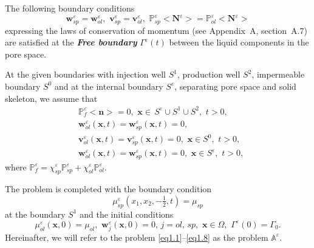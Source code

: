 \documentclass{article}
\theoremstyle{plain}
\theoremstyle{definition}
\numberwithin{equation}{section}
\begin{document}
The following boundary conditions 
\begin{equation}\label{eq1.5}
\boldsymbol{w}^{\varepsilon}_{sp}=\boldsymbol{w}^{\varepsilon}_{ol},\,\,
\boldsymbol{v}^{\varepsilon}_{sp}=\boldsymbol{v}^{\varepsilon}_{ol},\,\,
\mathbb{P}^{\varepsilon}_{sp}<\textbf{N}^{\varepsilon}>=
\mathbb{P}^{\varepsilon}_{ol}<\textbf{N}^{\varepsilon}>
\end{equation}
expressing the laws of conservation of momentum \cite{14} (see Appendix~A, section~A.7) are satisfied
at the \textbf{\emph{Free boundary}} $\Gamma^{\varepsilon}(t)$ between the liquid components in the pore space.

At the given boundaries with injection well ${S}^{1}$, production well ${S}^{2}$, impermeable boundary ${S}^{0}$ and at the internal boundary $S^{\varepsilon}$, separating pore space and solid skeleton, we assume that
\begin{equation}\label{eq1.6}
\begin{aligned}
&
\mathbb{P}^{\varepsilon}_{f}<\boldsymbol{n}>=0,\,\,
\boldsymbol{x}\in\,{S}^{\varepsilon}\cup{S}^{1}\cup{S}^{2},\,\,t>0,
\\
& \boldsymbol{w}^{\varepsilon}_{ol}(\boldsymbol{x},t)=
\boldsymbol{w}^{\varepsilon}_{sp}(\boldsymbol{x},t)=0,
\\
& \boldsymbol{v}^{\varepsilon}_{ol}(\boldsymbol{x},t)=
\boldsymbol{v}^{\varepsilon}_{sp}(\boldsymbol{x},t)=0,\,\,\boldsymbol{x}\in{S}^{0},\,\,t>0,
\\
& \boldsymbol{w}^{\varepsilon}_{ol}(\boldsymbol{x},t)=
\boldsymbol{w}^{\varepsilon}_{sp}(\boldsymbol{x},t)=0,\,\,\boldsymbol{x}\in{S}^{\varepsilon},\,\,t>0,
\end{aligned}
\end{equation}
where $\mathbb{P}^{\varepsilon}_{f}=\chi^{\varepsilon}_{sp}\mathbb{P}^{\varepsilon}_{sp}+
\chi^{\varepsilon}_{ol}\mathbb{P}^{\varepsilon}_{ol}$.

The problem is completed with the boundary condition
\begin{equation}\label{eq1.7}
{\mu}^{\varepsilon}_{sp}(x_{1},x_{2},-\tfrac{1}{2},t)={\mu}_{sp}
\end{equation}
at the boundary ${S}^{1}$ and the initial conditions
\begin{equation}\label{eq1.8}
{\mu}^{\varepsilon}_{ol}(\boldsymbol{x},0)={\mu}_{ol},\,\,
\boldsymbol{w}^{\varepsilon}_{j}(\boldsymbol{x},0)=0,\,j=ol,\,sp,\,\,\boldsymbol{x}\in\Omega,\,\,
\Gamma^{\varepsilon}(0)=\Gamma_{0}.
\end{equation}
Hereinafter, we will refer to the problem \eqref{eq1.1}--\eqref{eq1.8} as the problem $\mathbb{A}^{\varepsilon}$.
\end{document}
